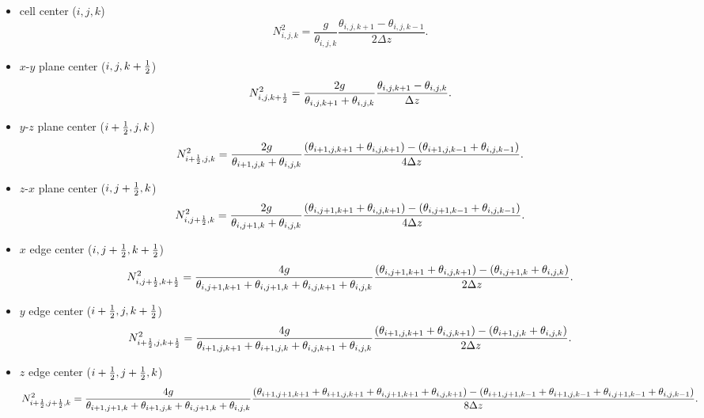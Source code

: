 \begin{itemize}
  \item cell center ($i,j,k$)
    \begin{equation}
      N^2_{i,j,k} = \frac{g}{\theta_{i,j,k}}
      \frac{\theta_{i,j,k+1}-\theta_{i,j,k-1}}{2\Delta z}.
    \end{equation}

  \item $x$-$y$ plane center ($i,j,k+\frac{1}{2}$)
    \begin{equation}
      N^2_{i,j,k+\frac{1}{2}} = \frac{2g}{\theta_{i,j,k+1}+\theta_{i,j,k}}
      \frac{\theta_{i,j,k+1}-\theta_{i,j,k}}{\Delta z}.
    \end{equation}

  \item $y$-$z$ plane center ($i+\frac{1}{2},j,k$)
    \begin{equation}
      N^2_{i+\frac{1}{2},j,k} = \frac{2g}{\theta_{i+1,j,k}+\theta_{i,j,k}}
      \frac{(\theta_{i+1,j,k+1}+\theta_{i,j,k+1})-(\theta_{i+1,j,k-1}+\theta_{i,j,k-1})}{4\Delta z}.
    \end{equation}

  \item $z$-$x$ plane center ($i,j+\frac{1}{2},k$)
    \begin{equation}
      N^2_{i,j+\frac{1}{2},k} = \frac{2g}{\theta_{i,j+1,k}+\theta_{i,j,k}}
      \frac{(\theta_{i,j+1,k+1}+\theta_{i,j,k+1})-(\theta_{i,j+1,k-1}+\theta_{i,j,k-1})}{4\Delta z}.
    \end{equation}

  \item $x$ edge center ($i,j+\frac{1}{2},k+\frac{1}{2}$)
    \begin{equation}
      N^2_{i,j+\frac{1}{2},k+\frac{1}{2}} = \frac{4g}{\theta_{i,j+1,k+1}+\theta_{i,j+1,k}+\theta_{i,j,k+1}+\theta_{i,j,k}}
      \frac{(\theta_{i,j+1,k+1}+\theta_{i,j,k+1})-(\theta_{i,j+1,k}+\theta_{i,j,k})}{2\Delta z}.
    \end{equation}

  \item $y$ edge center ($i+\frac{1}{2},j,k+\frac{1}{2}$)
    \begin{equation}
      N^2_{i+\frac{1}{2},j,k+\frac{1}{2}} = \frac{4g}{\theta_{i+1,j,k+1}+\theta_{i+1,j,k}+\theta_{i,j,k+1}+\theta_{i,j,k}}
      \frac{(\theta_{i+1,j,k+1}+\theta_{i,j,k+1})-(\theta_{i+1,j,k}+\theta_{i,j,k})}{2\Delta z}.
    \end{equation}

  \item $z$ edge center ($i+\frac{1}{2},j+\frac{1}{2},k$)
    \begin{equation}
      N^2_{i+\frac{1}{2},j+\frac{1}{2},k} = \frac{4g}{\theta_{i+1,j+1,k}+\theta_{i+1,j,k}+\theta_{i,j+1,k}+\theta_{i,j,k}}
      \frac{(\theta_{i+1,j+1,k+1}+\theta_{i+1,j,k+1}+\theta_{i,j+1,k+1}+\theta_{i,j,k+1})-(\theta_{i+1,j+1,k-1}+\theta_{i+1,j,k-1}+\theta_{i,j+1,k-1}+\theta_{i,j,k-1})}{8\Delta z}.
    \end{equation}


\end{itemize}

%
